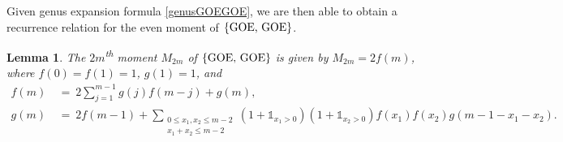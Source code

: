 \documentclass[11pt,reqno]{amsart}
\numberwithin{equation}{section}
\theoremstyle{plain}
\newtheorem{lemma}[thm]{Lemma}
\begin{document}
Given genus expansion formula \ref{genusGOEGOE}, we are then able to obtain a recurrence relation for the even moment of $\{\textup{GOE, GOE}\}$.

\begin{lemma}\label{GOE-GOE moment recurrence}
The $2m$\textsuperscript{th} moment $M_{2m}$ of $\{\textup{GOE, GOE}\}$ is given by $M_{2m}=2f(m)$, where $f(0)=f(1)=1$, $g(1)=1$, and
\begin{align}
f(m) &\ = \ 2\sum_{j=1}^{m-1}g(j)f(m-j) + g(m), \\
g(m) &\ = \ 2f(m-1) + \sum_{\substack{0\leq x_1,x_2\leq m-2\\ x_1+x_2\leq m-2}}(1+\mathbb{1}_{x_1>0})(1+\mathbb{1}_{x_2>0})f(x_1)f(x_2)g(m-1-x_1-x_2).
\end{align}
\end{lemma}
\end{document}
